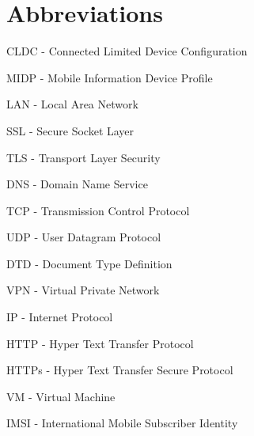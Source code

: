 \documentclass[11pt,twoside,a4paper]{book}
\begin{document}
%


\appendix



\chapter{Abbreviations}

\begin{description}
\item CLDC - Connected Limited Device Configuration
\item MIDP - Mobile Information Device Profile
\item LAN - Local Area Network
\item SSL - Secure Socket Layer
\item TLS - Transport Layer Security
\item DNS - Domain Name Service
\item TCP - Transmission Control Protocol
\item UDP - User Datagram Protocol
\item DTD - Document Type Definition
 \item VPN - Virtual Private Network
\item IP - Internet Protocol
\item HTTP - Hyper Text Transfer Protocol
\item HTTPs - Hyper Text Transfer Secure Protocol
\item VM - Virtual Machine
\item IMSI - International Mobile Subscriber Identity
\end{description}










\end{document}
